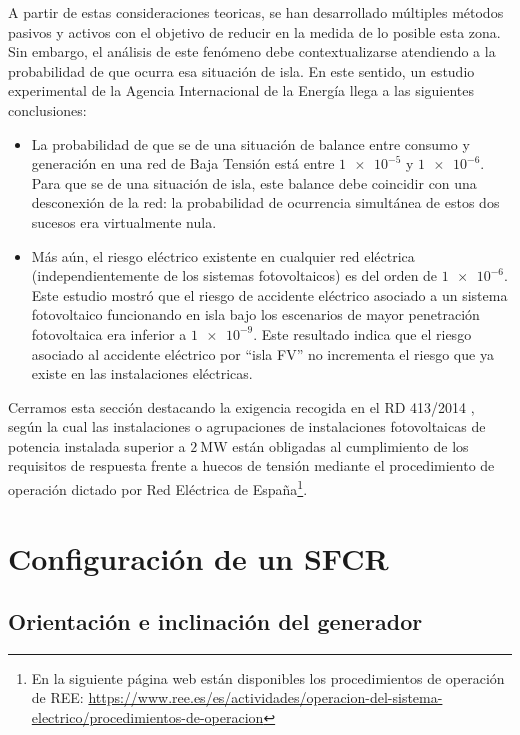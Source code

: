 A partir de estas consideraciones teoricas, se han desarrollado múltiples
métodos pasivos y activos con el objetivo de reducir en la medida
de lo posible esta zona. Sin embargo, el análisis de este fenómeno
debe contextualizarse atendiendo a la probabilidad de que ocurra esa
situación de isla. En este sentido, un estudio experimental de la
Agencia Internacional de la Energía \cite{Verhoeven2002,Cullen.Thornycroft.ea2002}
llega a las siguientes conclusiones: 
\begin{itemize}
\item La probabilidad de que se de una situación de balance entre consumo
y generación en una red de Baja Tensión está entre $\num{1e-5}$ y
$\num{1e-6}$. Para que se de una situación de isla, este balance
debe coincidir con una desconexión de la red: la probabilidad de ocurrencia
simultánea de estos dos sucesos era virtualmente nula. 
\item Más aún, el riesgo eléctrico existente en cualquier red eléctrica
(independientemente de los sistemas fotovoltaicos) es del orden de
$\num{1e-6}$. Este estudio mostró que el riesgo de accidente eléctrico
asociado a un sistema fotovoltaico funcionando en isla bajo los escenarios
de mayor penetración fotovoltaica era inferior a $\num{1e-9}$. Este
resultado indica que el riesgo asociado al accidente eléctrico por
\textquotedblleft{}isla FV\textquotedblright{} no incrementa el riesgo
que ya existe en las instalaciones eléctricas. 
\end{itemize}

Cerramos esta sección destacando la exigencia recogida en el RD
413/2014 \cite{RD-413-2014}, según la cual las instalaciones o
agrupaciones de instalaciones fotovoltaicas de potencia instalada
superior a $\qty{2}{\mega\watt}$ están obligadas al cumplimiento de
los requisitos de respuesta frente a huecos de tensión mediante el
procedimiento de operación dictado por Red Eléctrica de
España\footnote{En la siguiente página web están disponibles los procedimientos de operación de REE:  \url{https://www.ree.es/es/actividades/operacion-del-sistema-electrico/procedimientos-de-operacion}
  }.

\section{Configuración de un SFCR}


\subsection{\label{sub:Orientacion-e-inclinacion}Orientación e inclinación
del generador}

